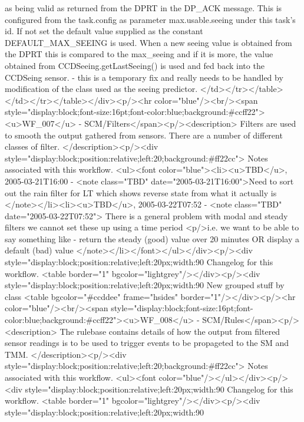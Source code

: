 	    as being valid as returned from the DPRT in the DP_ACK message. This is configured from the
	    task.config as parameter max.usable.seeing under this task's id. If not set the default value supplied as
	    the constant DEFAULT_MAX_SEEING is used. When a new seeing value is obtained from the DPRT this is compared
	    to the max_seeing and if it is more, the value obtained from CCDSeeing.getLastSeeing() 
	    is used and fed back into the CCDSeing sensor. - this is a temporary fix and really needs to be handled 
	    by modification of the class used as the seeing predictor.
	  </td></tr></table></td></tr></table></div><p/><hr color="blue"/><br/><span style="display:block;font-size:16pt;font-color:blue;background:#ccff22"><u>WF_007</u> -    SCM/Filters</span><p/><description>
	Filters are used to smooth the output gathered from sensors. There are a number of different
	classes of filter.
      </description><p/><div style="display:block;position:relative;left:20;background:#ff22cc">
      Notes associated with this workflow.
      <ul><font color="blue"><li><u>TBD</u>, 2005-03-21T16:00 -  <note class="TBD" date="2005-03-21T16:00">Need to sort out the rain filter for LT which shows reverse state 
	from what it actually is
      </note></li><li><u>TBD</u>, 2005-03-22T07:52 -  <note class="TBD" date="2005-03-22T07:52"> 
	There is a general problem with modal and steady filters we cannot set these up using a time period 
	<p/>i.e. we want to be able to say something like 
	  - return the steady (good) value over 20 minutes OR display a default (bad) value   
      </note></li></font></ul></div><p/><div style="display:block;position:relative;left:20px;width:90%
      Changelog for this workflow.
      <table border="1" bgcolor="lightgrey"/></div><p/><div style="display:block;position:relative;left:20px;width:90%
     New grouped stuff by class
     <table bgcolor="#ccddee" frame="hsides" border="1"/></div><p/><hr color="blue"/><br/><span style="display:block;font-size:16pt;font-color:blue;background:#ccff22"><u>WF_008</u> -    SCM/Rules</span><p/><description>
	The rulebase contains details of how the output from filtered sensor readings is to be used to trigger
	events to be propageted to the SM and TMM.
      </description><p/><div style="display:block;position:relative;left:20;background:#ff22cc">
      Notes associated with this workflow.
      <ul><font color="blue"/></ul></div><p/><div style="display:block;position:relative;left:20px;width:90%
      Changelog for this workflow.
      <table border="1" bgcolor="lightgrey"/></div><p/><div style="display:block;position:relative;left:20px;width:90%

